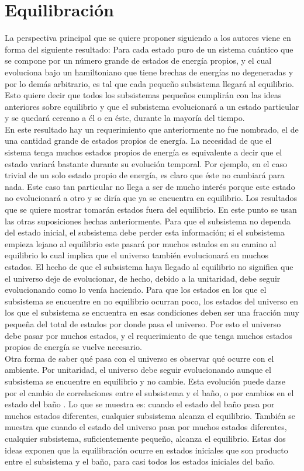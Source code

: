\section{Equilibración}

La perspectiva principal que se quiere proponer siguiendo a  los autores \cite{LindenPaper} viene en forma del siguiente resultado: Para cada estado puro de un sistema cuántico que se compone por un número grande de estados de energía propios, y el cual evoluciona bajo un hamiltoniano que tiene brechas de energías no degeneradas y por lo demás arbitrario, es tal que cada pequeño subsistema llegará al equilibrio. Esto quiere decir que todos los subsistemas pequeños cumplirán con las ideas anteriores sobre equilibrio y que el subsistema evolucionará a un estado particular y se quedará cercano a él o en éste, durante la mayoría del tiempo.
\\
En este resultado hay un requerimiento que anteriormente no fue nombrado, el de una cantidad grande de estados propios de energía. La necesidad de que el sistema tenga muchos estados propios de energía es equivalente a decir que el estado variará bastante durante su evolución temporal. Por ejemplo, en el caso trivial de un solo estado propio de energía, es claro que éste no cambiará para nada. Este caso tan particular no llega a ser de mucho interés porque este estado no evolucionará a otro y se diría que ya se encuentra en equilibrio. Los resultados que se quiere mostrar tomarán estados fuera del equilibrio. En este punto se usan las otras suposiciones hechas anteriormente. Para que el subsistema no dependa del estado inicial, el subsistema debe perder esta información; si el subsistema empieza lejano al equilibrio este pasará  por muchos estados en su camino al equilibrio lo cual implica que el universo también evolucionará en muchos estados. El hecho de que el subsistema haya llegado al equilibrio no significa que el universo deje de evolucionar, de hecho, debido a la unitaridad, debe seguir evolucionando como lo venía haciendo. Para que los estados en los que el subsistema se encuentre en no equilibrio ocurran poco, los estados del universo en los que el subsistema se encuentra en esas condiciones deben ser una fracción muy pequeña del total de estados por donde pasa el universo. Por esto el universo debe pasar por muchos estados, y el requerimiento de que tenga muchos estados propios de energía se vuelve necesario. 
\\
Otra forma de saber qué pasa con el universo es observar qué ocurre con el ambiente. Por unitaridad, el universo debe seguir evolucionando aunque el subsistema se encuentre en equilibrio y no cambie. Esta evolución puede darse por el cambio de correlaciones entre el subsistema y el baño, o por cambios en el estado del baño \cite{Decoherence}. Lo que se muestra es: cuando el estado del baño pasa por muchos estados diferentes, cualquier subsistema alcanza el equilibrio. También se muestra que cuando el estado del universo pasa por muchos estados diferentes, cualquier subsistema, suficientemente pequeño, alcanza el equilibrio. Estas dos ideas exponen que la equilibración ocurre en estados iniciales que son producto entre el subsistema y el baño, para casi todos los estados iniciales del baño.
\\
 
